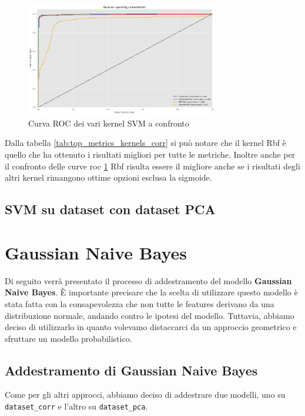     \begin{figure}[!ht]
        \centering
        \includegraphics[width=0.75\textwidth]{img/svm/roc_SVM.png}
        \caption{Curva ROC dei vari kernel SVM a confronto}
        \label{fig:roc_SVM_corr}
    \end{figure}

    Dalla tabella \ref{tab:top_metrics_kernels_corr} si può notare che il kernel Rbf
    è quello che ha ottenuto i risultati migliori per tutte le metriche. Inoltre anche
    per il confronto delle curve roc \ref{fig:roc_SVM_corr} Rbf risulta essere il
    migliore anche se i risultati degli altri kernel rimangono ottime opzioni esclusa
    la sigmoide.

\subsection{SVM su dataset con dataset PCA}

\section{Gaussian Naive Bayes}
Di seguito verrà presentato il processo di addestramento del modello
\textbf{Gaussian Naive Bayes}. È importante precisare che la scelta di utilizzare
questo modello è stata fatta con la consapevolezza che non tutte le features
derivano da una distribuzione normale, andando contro le ipotesi del modello.
Tuttavia, abbiamo deciso di utilizzarlo in quanto volevamo distaccarci da un
approccio geometrico e sfruttare un modello probabilistico.
\subsection{Addestramento di Gaussian Naive Bayes}
Come per gli altri approcci, abbiamo deciso di addestrare due modelli, uno su
\texttt{dataset\_corr} e l'altro su \texttt{dataset\_pca}.

